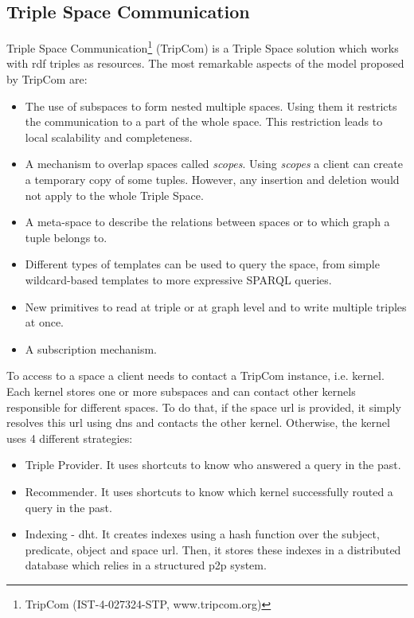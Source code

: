 \subsection{Triple Space Communication}

Triple Space Communication\footnote{TripCom (IST-4-027324-STP, www.tripcom.org)} (TripCom) is a Triple Space solution which works with \ac{rdf} triples as resources.
The most remarkable aspects of the model proposed by TripCom are:
\begin{itemize}
  \item The use of subspaces to form nested multiple spaces.
	Using them it restricts the communication to a part of the whole space.
	This restriction leads to local scalability and completeness.
  \item A mechanism to overlap spaces called \emph{scopes}.
	Using \emph{scopes} a client can create a temporary copy of some tuples.
	However, any insertion and deletion would not apply to the whole Triple Space.
  \item A meta-space to describe the relations between spaces or to which graph a tuple belongs to.
  \item Different types of templates can be used to query the space, from simple wildcard-based templates to more expressive SPARQL queries.
  \item New primitives to read at triple or at graph level and to write multiple triples at once.
  \item A subscription mechanism.
\end{itemize}


To access to a space a client needs to contact a TripCom instance, i.e. kernel.
Each kernel stores one or more subspaces and can contact other kernels responsible for different spaces.
To do that, if the space \ac{url} is provided, it simply resolves this \ac{url} using \ac{dns} and contacts the other kernel.
Otherwise, the kernel uses 4 different strategies:
\begin{itemize}
  \item Triple Provider. It uses shortcuts to know who answered a query in the past.
  \item Recommender. It uses shortcuts to know which kernel successfully routed a query in the past.
  \item Indexing - \ac{dht}.
	It creates indexes using a hash function over the subject, predicate, object and space \ac{url}.
	Then, it stores these indexes in a distributed database which relies in a structured \ac{p2p} system. %
\end{itemize}


